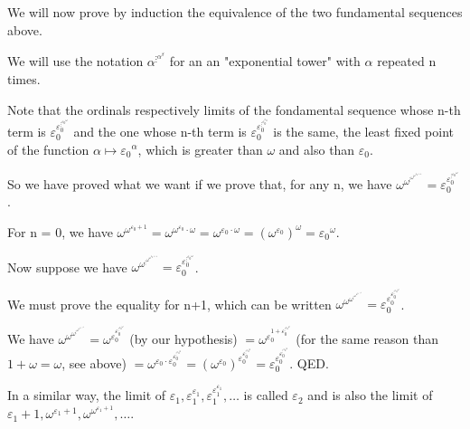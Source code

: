 \documentclass[10pt]{article}
\begin{document}
\bigskip

We will now prove by induction the equivalence of the two fundamental sequences above.

We will use the notation \( \alpha^{\vdots^{\alpha^\beta}} \) for an an "exponential tower" with \( \alpha \) repeated n times. 


Note that the ordinals respectively limits of the fondamental sequence whose n-th term is \(\varepsilon_0^{\varepsilon_0^{\vdots^{{\varepsilon_0}^\omega}}} \) and the one whose n-th term is \( \varepsilon_0^{\varepsilon_0^{\vdots^{\varepsilon_0^{\varepsilon_0}}}} \) is the same, the least fixed point of the function \( \alpha \mapsto {\varepsilon_0}^\alpha \), which is greater than \( \omega \) and also than \( \varepsilon_0 \).

So we have proved what we want if we prove that, for any n, we have \( \omega^{\omega^{\vdots^{\omega^{\omega^{\varepsilon_0+1}}}}} = \varepsilon_0^{\varepsilon_0^{\vdots^{{\varepsilon_0}^\omega}}} \). 

For n = 0, we have \( \omega^{\omega^{\varepsilon_0+1}} = \omega^{\omega^{\varepsilon_0}\cdot\omega} = \omega^{\varepsilon_0\cdot\omega} = (\omega^{\varepsilon_0})^\omega = {\varepsilon_0}^\omega \). 

Now suppose we have \( \omega^{\omega^{\vdots^{\omega^{\omega^{\varepsilon_0+1}}}}} = \varepsilon_0^{\varepsilon_0^{\vdots^{{\varepsilon_0}^\omega}}} \). 

We must prove the equality for n+1, which can be written \( \omega^{\omega^{\omega^{\vdots^{\omega^{\omega^{\varepsilon_0+1}}}}}} = \varepsilon_0^{\varepsilon_0^{\varepsilon_0^{\vdots^{{\varepsilon_0}^\omega}}}} \). 

We have \( \omega^{\omega^{\omega^{\vdots^{\omega^{\omega^{\varepsilon_0+1}}}}}} = \omega^{\varepsilon_0^{\varepsilon_0^{\vdots^{{\varepsilon_0}^\omega}}}} \) (by our hypothesis) \( = \omega^{\varepsilon_0^{1+\varepsilon_0^{\vdots^{{\varepsilon_0}^\omega}}}} \) (for the same reason than \( 1+\omega = \omega \), see above) \( = \omega^{\varepsilon_0\cdot\varepsilon_0^{\varepsilon_0^{\vdots^{{\varepsilon_0}^\omega}}}} = (\omega^{\varepsilon_0})^{\varepsilon_0^{\varepsilon_0^{\vdots^{{\varepsilon_0}^\omega}}}} = \varepsilon_0^{\varepsilon_0^{\varepsilon_0^{\vdots^{{\varepsilon_0}^\omega}}}} \). QED.


In a similar way, the limit of \( \varepsilon_1, \varepsilon_1^{\varepsilon_1}, \varepsilon_1^{\varepsilon_1^{\varepsilon_1}}, \ldots \) is called \( \varepsilon_2 \) and is also the limit of \( \varepsilon_1+1, \omega^{\varepsilon_1+1}, \omega^{\omega^{\varepsilon_1+1}}, \ldots \).
\end{document}

